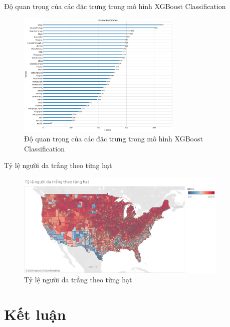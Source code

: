 \documentclass[10pt]{beamer}
\theoremstyle{remark}
\theoremstyle{definition}
\begin{document}
\begin{frame}{Độ quan trọng của các đặc trưng trong mô hình XGBoost Classification}
	\begin{figure}[h!]
        \centering
        \includegraphics[width=0.7\textwidth]{figures/XGBoost_Regression_Feature_Importance.png}
        \caption{Độ quan trọng của các đặc trưng trong mô hình XGBoost Classification}
    \end{figure}
\end{frame}

\begin{frame}{Tỷ lệ người da trắng theo từng hạt}
	\begin{figure}[h!]
        \centering
        \includegraphics[width=0.9\textwidth]{figures/County_Percentage_White_People.png}
        \caption{Tỷ lệ người da trắng theo từng hạt}
    \end{figure}
\end{frame}

\section{Kết luận}
\end{document}
